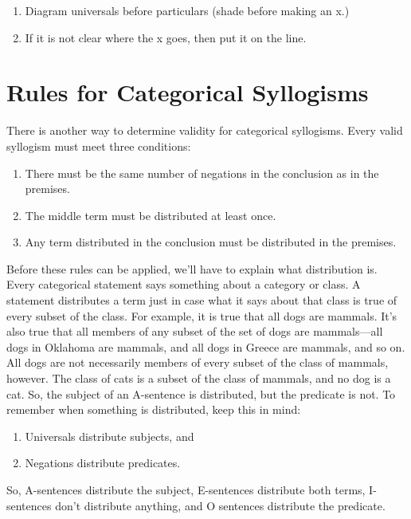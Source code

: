 \begin{enumerate}

  

\item Diagram universals before particulars (shade before making an x.)
\item If it is not clear where the x goes, then put it on the line.
\end{enumerate}

\section{Rules for Categorical Syllogisms}

There is another way to determine validity for categorical syllogisms. Every valid syllogism must meet three conditions:


\begin{enumerate}


\item There must be the same number of negations in the conclusion as in the premises.
\item The middle term must be distributed at least once.
\item Any term distributed in the conclusion must be distributed in the premises.
\end{enumerate}

Before these rules can be applied, we'll have to explain what distribution is. Every categorical statement says something about a category or class. A statement distributes a term just in case what it says about that class is true of every subset of the class. For example, it is true that all dogs are mammals. It's also true that all members of any subset of the set of dogs are mammals---all dogs in Oklahoma are mammals, and all dogs in Greece are mammals, and so on. All dogs are not necessarily members of every subset of the class of mammals, however. The class of cats is a subset of the class of mammals, and no dog is a cat. So, the subject of an A-sentence is distributed, but the predicate is not.  To remember when something is distributed, keep this in mind:

\begin{enumerate}
\item Universals distribute subjects, and
\item Negations distribute predicates.
\end{enumerate}

So, A-sentences distribute the subject, E-sentences distribute both terms, I-sentences don't distribute anything, and O sentences distribute the predicate.

